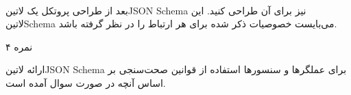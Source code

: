 \paragraph{}
بعد از طراحی پروتکل یک ‌لاتین{JSON Schema} نیز برای آن طراحی کنید.
این ‌لاتین{Schema} می‌بایست خصوصیات ذکر شده برای هر ارتباط را در نظر گرفته باشد.


۴ نمره


 ارائه ‌لاتین{JSON Schema} برای عملگرها و سنسورها
 استفاده از قوانین صحت‌سنجی بر اساس آنچه در صورت سوال آمده است.

